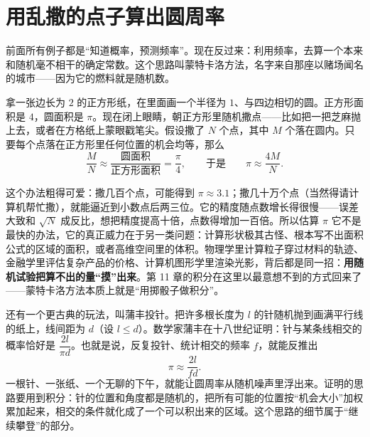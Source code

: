 \section{用乱撒的点子算出圆周率}

前面所有例子都是“知道概率，预测频率”。现在反过来：利用频率，去算一个本来和随机毫不相干的确定常数。这个思路叫蒙特卡洛方法，名字来自那座以赌场闻名的城市——因为它的燃料就是随机数。

拿一张边长为 $2$ 的正方形纸，在里面画一个半径为 $1$、与四边相切的圆。正方形面积是 $4$，圆面积是 $\pi$。现在闭上眼睛，朝正方形里随机撒点——比如把一把芝麻抛上去，或者在方格纸上蒙眼戳笔尖。假设撒了 $N$ 个点，其中 $M$ 个落在圆内。只要每个点落在正方形里任何位置的机会均等，那么
\[
\frac{M}{N}\approx \frac{\text{圆面积}}{\text{正方形面积}}=\frac{\pi}{4},
\qquad\text{于是}\qquad
\pi\approx \frac{4M}{N}.
\]

\begin{center}
\end{center}

这个办法粗得可爱：撒几百个点，可能得到 $\pi\approx 3.1$；撒几十万个点（当然得请计算机帮忙撒），就能逼近到小数点后两三位。它的精度随点数增长得很慢——误差大致和 $\sqrt{N}$ 成反比，想把精度提高十倍，点数得增加一百倍。所以估算 $\pi$ 它不是最快的办法，它的真正威力在于另一类问题：计算形状极其古怪、根本写不出面积公式的区域的面积，或者高维空间里的体积。物理学里计算粒子穿过材料的轨迹、金融学里评估复杂产品的价格、计算机图形学里渲染光影，背后都是同一招：\textbf{用随机试验把算不出的量“摸”出来}。第 11 章的积分在这里以最意想不到的方式回来了——蒙特卡洛方法本质上就是“用掷骰子做积分”。

还有一个更古典的玩法，叫蒲丰投针。把许多根长度为 $l$ 的针随机抛到画满平行线的纸上，线间距为 $d$（设 $l\le d$）。数学家蒲丰在十八世纪证明：针与某条线相交的概率恰好是 $\dfrac{2l}{\pi d}$。也就是说，反复投针、统计相交的频率 $f$，就能反推出
\[
\pi\approx \frac{2l}{fd}.
\]
一根针、一张纸、一个无聊的下午，就能让圆周率从随机噪声里浮出来。证明的思路要用到积分：针的位置和角度都是随机的，把所有可能的位置按“机会大小”加权累加起来，相交的条件就化成了一个可以积出来的区域。这个思路的细节属于“继续攀登”的部分。

